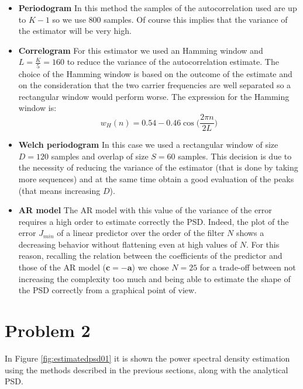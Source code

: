 \documentclass[a4paper, 12pt]{report}
\begin{document}
\begin{itemize}
	
\item {\bf Periodogram} In this method the samples of the autocorrelation used are up to $K-1$ so we use 800 samples. Of course this implies that the variance of the estimator will be very high.

\item {\bf Correlogram}  For this estimator we used an Hamming window and $L=\frac{K}{5}=160$ to reduce the variance of the autocorrelation estimate. The choice of the Hamming window is based on the outcome of the estimate and on the consideration that the two carrier frequencies are well separated so a rectangular window would perform worse. The expression for the Hamming window is:
\begin{equation}
w_H(n)=0.54-0.46\cos\Big( \frac{2 \pi n}{2L} \Big)
\end{equation}

\item {\bf Welch periodogram} In this case we used a rectangular window of size $D=120$ samples and overlap of size $S=60$ samples. This decision is due to the necessity of reducing the variance of the estimator (that is done by taking more sequences) and at the same time obtain a good evaluation of the peaks (that means increasing $D$). 

\item {\bf AR model} The AR model with this value of the variance of the error requires a high order to estimate correctly the PSD. Indeed, the plot of the error $J_{min}$ of a linear predictor over the order of the filter $N$ shows a decreasing behavior without flattening even at high values of $N$. For this reason, recalling the relation between the coefficients of the predictor and those of the AR model ($\mathbf{c} = -\mathbf{a}$)  we chose $N=25$ for a trade-off between not increasing the complexity too much and being able to estimate the shape of the PSD correctly from a graphical point of view.  %

\end{itemize}

\section*{Problem 2}
In Figure \ref{fig:estimatedpsd01} it is shown the power spectral density estimation using the methods described in the previous sections, along with the analytical PSD.
\end{document}
